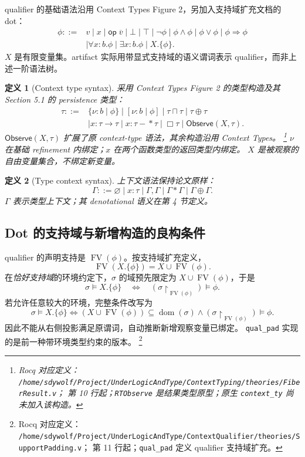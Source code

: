 \documentclass[UTF8,a4paper,11pt,fontset=fandol]{ctexart}
\newcommand{\FV}{\operatorname{FV}}
\newcommand{\dom}{\operatorname{dom}}
\newcommand{\oty}[2]{\{\nu:#1\mid #2\}}
\newcommand{\uty}[2]{[\nu:#1\mid #2]}
\newcommand{\Observe}{\ensuremath{\mathsf{Observe}}}
\newcommand{\rocqdefnote}[3]{%
  \footnote{Rocq 对应定义：
  \nolinkurl{/home/sdywolf/Project/UnderLogicAndType/#1}；
  第 #2 行起；#3。}}
\newtheorem{definition}{定义}[section]
\begin{document}
qualifier 的基础语法沿用 Context Types Figure 2，另加入支持域扩充文档的 dot\cite{dot}：
\begin{align*}
 \phi::={}&v\mid x\mid\mathsf{op}\;\overline v\mid\bot\mid\top\mid\neg\phi
 \mid\phi\land\phi\mid\phi\lor\phi\mid\phi\Rightarrow\phi\\
 &\mid\forall x:b.\phi\mid\exists x:b.\phi\mid X.\{\phi\}.
\end{align*}
$X$ 是有限变量集。artifact 实际用带显式支持域的语义谓词表示 qualifier，而非上述一阶语法树。

\begin{definition}[Context type syntax]
采用 Context Types Figure 2 的类型构造及其 Section 5.1 的 persistence 类型：
\begin{align}\label{eq:type-syntax}
 \tau::={}&\oty{b}{\phi}\mid\uty{b}{\phi}
 \mid\tau\sqcap\tau\mid\tau\oplus\tau\nonumber\\
 &\mid x:\tau\to\tau\mid x:\tau-\!\ast\tau\mid\Box\tau
 \mid\Observe(X,\tau).
\end{align}
$\Observe(X,\tau)$ 扩展了原 context-type 语法，其余构造沿用 Context Types。
\rocqdefnote{ContextTyping/theories/FiberResult.v}{10}{\texttt{RTObserve} 是结果类型原型；原生 \texttt{context\_ty} 尚未加入该构造}
$\nu$ 在基础 refinement 内绑定；$x$ 在两个函数类型的返回类型内绑定。
$X$ 是被观察的自由变量集合，不绑定新变量。
\end{definition}

\begin{definition}[Type context syntax]
上下文语法保持论文原样：
\[
 \Gamma::=\varnothing\mid x:\tau\mid\Gamma,\Gamma
           \mid\Gamma\ast\Gamma\mid\Gamma\oplus\Gamma.
\]
$\Gamma$ 表示类型上下文；其 denotational 语义在第 4 节定义。
\end{definition}

\subsection{Dot 的支持域与新增构造的良构条件}

qualifier 的声明支持是 $\FV(\phi)$。按支持域扩充定义，
\[
 \FV(X.\{\phi\})=X\cup\FV(\phi).
\]
在\emph{恰好支持域}的环境约定下，$\sigma$ 的域预先限定为 $X\cup\FV(\phi)$，于是
\begin{equation}\label{eq:pad}
 \sigma\models X.\{\phi\}\quad\Longleftrightarrow\quad
 (\sigma\upharpoonright_{\FV(\phi)})\models\phi.
\end{equation}
若允许任意较大的环境，完整条件改写为
\[
 \sigma\models X.\{\phi\}\Longleftrightarrow
 (X\cup\FV(\phi))\subseteq\dom(\sigma)
 \land(\sigma\upharpoonright_{\FV(\phi)})\models\phi.
\]
因此不能从右侧投影满足原谓词，自动推断新增观察变量已绑定。
\texttt{qual\_pad} 实现的是前一种带环境类型约束的版本。
\rocqdefnote{ContextQualifier/theories/SupportPadding.v}{11}{\texttt{qual\_pad} 定义 qualifier 支持域扩充}
\end{document}
